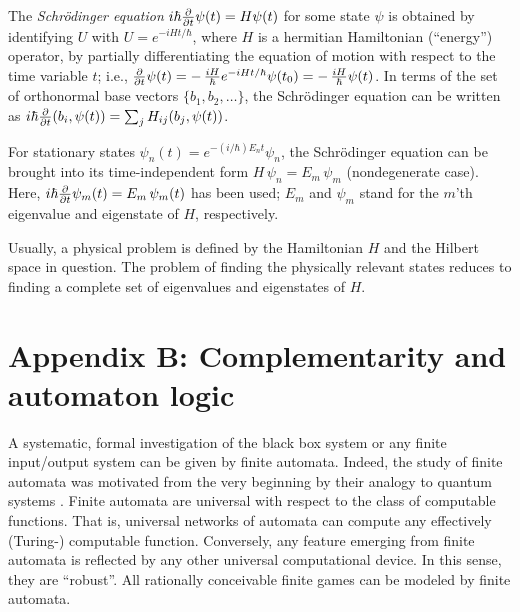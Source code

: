 \documentclass [11pt]{llncs}
\begin{document}
\begin{description}
The {\em Schr\"odinger equation}
$
i\hbar {\partial \over \partial t}  \psi (t)    =
H \psi (t) $
for some state $\psi$  is obtained by identifying $U$ with
$U=e^{-iHt/\hbar }$,
where $H$ is a hermitian  Hamiltonian (``energy'') operator,
by partially differentiating the equation of motion
with respect to the time variable $t$;
i.e.,
$
 {\partial \over \partial t} \psi (t) =-\,{iH\over
\hbar
}e^{-i{H}t/\hbar}
\psi (t_0 ) = -\,{i{H}\over \hbar } \psi (t)
$.
In terms of the
set of orthonormal base vectors $\{ b_1, b_2, \ldots
\}$, the Schr\"odinger equation can be written as
$i\hbar {\partial \over \partial t} ( b_i , \psi (t) )   =
\sum_{j}
H_{ij}( b_j, \psi (t) )$.

For stationary states $ \psi_n
(t)=
e^{-(i/\hbar )E_nt}  \psi_n $, the Schr\"odinger equation
can be brought into its time-independent form
$H\, \psi_n
=
E_m\, \psi_m $ (nondegenerate case).
Here,
$i\hbar {\partial \over \partial t} \psi_m (t)
=
E_m \, \psi_m (t) $  has been used;
$E_m$
and $\psi_m $
stand for the $m$'th eigenvalue and eigenstate of
$H$, respectively.

\end{description}

Usually, a physical problem is defined by the Hamiltonian ${H}$ and the
Hilbert space in question.
The problem of finding the physically relevant states reduces to finding
a complete set of eigenvalues and eigenstates of ${H}$.

\section*{Appendix B: Complementarity and automaton logic}

 \label{appendix-b}
\label{d:parlog}

A systematic, formal investigation of the black box system
or any finite input/output system can be given by finite automata.
Indeed, the study of finite automata was motivated from the very
beginning
by their analogy to quantum systems \cite{e-f-moore}. Finite automata
are
universal with respect to the class of computable functions. That is,
universal
networks of automata can compute any effectively (Turing-) computable
function. Conversely, any feature emerging from finite automata is
reflected by any other universal computational device.
In this sense, they are ``robust''.
All rationally conceivable finite games can be modeled by finite
automata.
\end{document}
